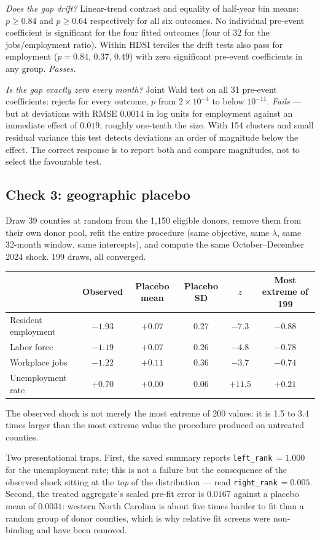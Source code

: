 \documentclass[11pt,a4paper]{article}
\begin{document}
\emph{Does the gap drift?} Linear-trend contrast and equality of half-year bin means: $p\ge0.84$ and
$p\ge0.64$ respectively for all six outcomes. No individual pre-event coefficient is significant for
the four fitted outcomes (four of 32 for the jobs/employment ratio). Within HDSI terciles the drift
tests also pass for employment ($p=0.84$, $0.37$, $0.49$) with zero significant pre-event coefficients
in any group. \emph{Passes.}

\emph{Is the gap exactly zero every month?} Joint Wald test on all 31 pre-event coefficients: rejects
for every outcome, $p$ from $2\times10^{-4}$ to below $10^{-11}$. \emph{Fails} --- but at deviations
with RMSE $0.0014$ in log units for employment against an immediate effect of $0.019$, roughly
one-tenth the size. With 154 clusters and small residual variance this test detects deviations an order
of magnitude below the effect. The correct response is to report both and compare magnitudes, not to
select the favourable test.

\subsection{Check 3: geographic placebo}
Draw 39 counties at random from the 1{,}150 eligible donors, remove them from their own donor pool,
refit the entire procedure (same objective, same $\lambda$, same 32-month window, same intercepts), and
compute the same October--December 2024 shock. 199 draws, all converged.
\begin{center}\small
\begin{tabular}{lccccc}
\toprule
 & Observed & Placebo mean & Placebo SD & $z$ & Most extreme of 199\\
\midrule
Resident employment & $-1.93$ & $+0.07$ & 0.27 & $-7.3$ & $-0.88$\\
Labor force & $-1.19$ & $+0.07$ & 0.26 & $-4.8$ & $-0.78$\\
Workplace jobs & $-1.22$ & $+0.11$ & 0.36 & $-3.7$ & $-0.74$\\
Unemployment rate & $+0.70$ & $+0.00$ & 0.06 & $+11.5$ & $+0.21$\\
\bottomrule
\end{tabular}
\end{center}
The observed shock is not merely the most extreme of 200 values: it is 1.5 to 3.4 times larger than the
most extreme value the procedure produced on untreated counties.

Two presentational traps. First, the saved summary reports \texttt{left\_rank}$\,=1.000$ for the
unemployment rate; this is not a failure but the consequence of the observed shock sitting at the
\emph{top} of the distribution --- read \texttt{right\_rank}$\,=0.005$. Second, the treated aggregate's
scaled pre-fit error is $0.0167$ against a placebo mean of $0.0031$: western North Carolina is about
five times harder to fit than a random group of donor counties, which is why relative fit screens were
non-binding and have been removed.
\end{document}
